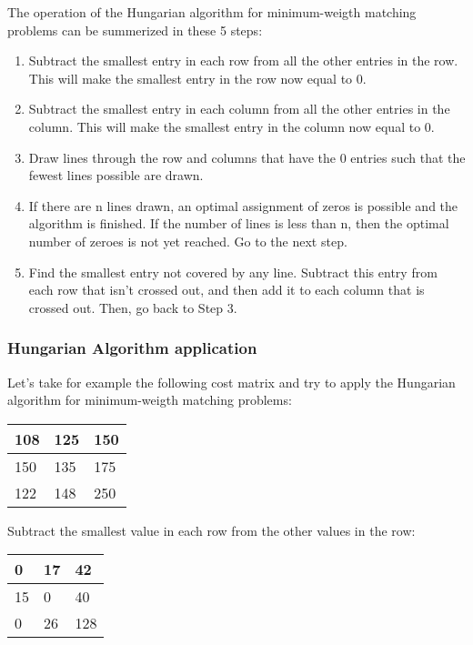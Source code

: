 The operation of the Hungarian algorithm for minimum-weigth matching problems can be summerized in these 5 steps:
\begin{enumerate}
    \item {Subtract the smallest entry in each row from all the other entries in the row. This will make the smallest entry in the row now equal to 0.}
    \item {Subtract the smallest entry in each column from all the other entries in the column. This will make the smallest entry in the column now equal to 0.}
    \item {Draw lines through the row and columns that have the 0 entries such that the fewest lines possible are drawn.}
    \item {If there are n lines drawn, an optimal assignment of zeros is possible and the algorithm is finished. If the number of lines is less than n, then the optimal number of zeroes is not yet reached. Go to the next step.}
    \item {Find the smallest entry not covered by any line. Subtract this entry from each row that isn’t crossed out, and then add it to each column that is crossed out. Then, go back to Step 3.}
\end{enumerate}

\subsubsection{Hungarian Algorithm application}

Let's take for example the following cost matrix and try to apply the Hungarian algorithm for minimum-weigth matching problems:

\begin{table}[H]
\centering
\begin{tabular}{|m{0.5cm}|m{0.5cm}|m{0.5cm}|}
  \hline
  108 & 125 & 150 \\
  \hline
  150 & 135 & 175 \\
  \hline
  122 & 148 & 250 \\
  \hline
\end{tabular}
\end{table}

Subtract the smallest value in each row from the other values in the row:

\begin{table}[H]
\centering
\begin{tabular}{|m{0.5cm}|m{0.5cm}|m{0.5cm}|}
  \hline
  0 & 17 & 42 \\
  \hline
  15 & 0 & 40 \\
  \hline
  0 & 26 & 128 \\
  \hline
\end{tabular}
\end{table}

